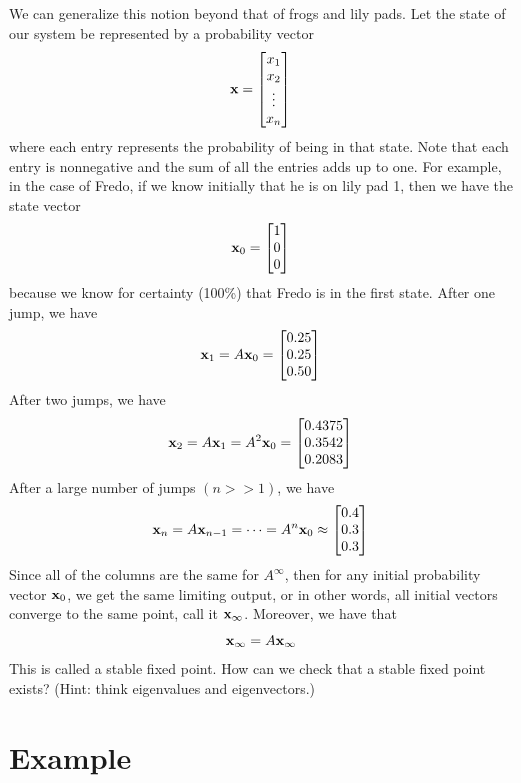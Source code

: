 We can generalize this notion beyond that of frogs and lily pads.
Let the state of our system be represented by a probability vector
\[
{\bf x} = \begin{bmatrix}
x_1\\
x_2\\
\vdots\\
x_n
\end{bmatrix}
\]
where each entry represents the probability of being in that state.
Note that each entry is nonnegative and the sum of all the entries adds up to one.
For example, in the case of Fredo, if we know initially that he is on lily pad 1, then we have the state vector
\[
{\bf x}_0 = \begin{bmatrix}
1\\
0\\
0
\end{bmatrix}
\]
because we know for certainty (100\%) that Fredo is in the first state.
After one jump, we have
\[
{\bf x}_1 = A {\bf x}_0 = \begin{bmatrix}
0.25\\
0.25\\
0.50
\end{bmatrix}
\]
After two jumps, we have
\[
{\bf x}_2 = A {\bf x}_1 = A^2 {\bf x}_0 = \begin{bmatrix}
0.4375\\
0.3542\\
0.2083
\end{bmatrix}
\]
After a large number of jumps $(n>>1)$, we have
\[
{\bf x}_n = A {\bf x}_{n-1} = \dots = A^n {\bf x}_0 \approx \begin{bmatrix}
0.4\\
0.3\\
0.3
\end{bmatrix}
\]
Since all of the columns are the same for $A^\infty$, then for any initial probability vector ${\bf x}_0$, we get the same limiting output, or in other words, all initial vectors converge to the same point, call it ${\bf x}_\infty$.
Moreover, we have that
\[
{\bf x}_\infty = A {\bf x}_\infty
\]
This is called a stable fixed point.
How can we check that a stable fixed point exists?
(Hint: think eigenvalues and eigenvectors.)

\section*{Example}

